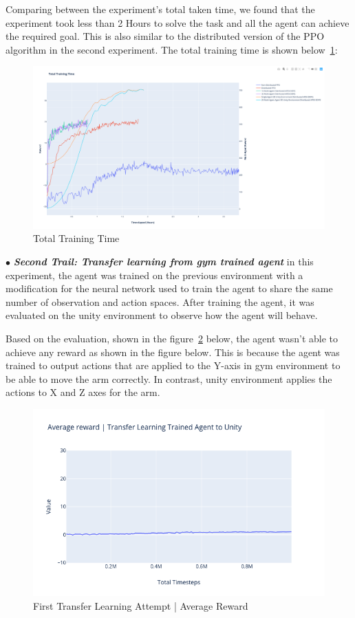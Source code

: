 Comparing between the experiment's total taken time, we found that the experiment took less than 2 Hours to solve the task and all the agent can achieve the required goal. This is also similar to the distributed version of the PPO algorithm in the second experiment. The total training time is shown below~\ref{fig:4th_exp_total_training_time}:
\begin{figure}[!htb]
		\centering
		\includegraphics[width=\linewidth]{figures/exps/4th_exp/total_training_time.png}
		\caption{Total Training Time}
		\label{fig:4th_exp_total_training_time}
\end{figure}

$\bullet$ \textit{\textbf{Second Trail: Transfer learning from gym trained agent}} in this experiment, the agent was trained on the previous environment with a modification for the neural network used to train the agent to share the same number of observation and action spaces. After training the agent, it was evaluated on the unity environment to observe how the agent will behave.

Based on the evaluation, shown in the figure~\ref{fig:4th_exp_1st_transfer_learning} below, the agent wasn't able to achieve any reward as shown in the figure below. This is because the agent was trained to output actions that are applied to the Y-axis in gym environment to be able to move the arm correctly. In contrast, unity environment applies the actions to X and Z axes for the arm.
\begin{figure}[!htb]
		\centering
		\includegraphics[width=\linewidth]{figures/exps/4th_exp/1st_transfer_learning.png}
		\caption{First Transfer Learning Attempt | Average Reward}
		\label{fig:4th_exp_1st_transfer_learning}
\end{figure}

